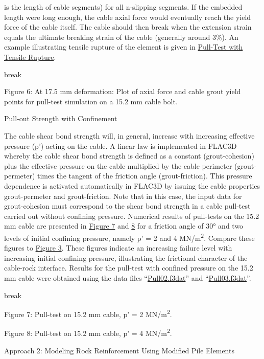 \documentclass[a4paper, nobind]{templates/ociamthesis}
\begin{document}
is the length of cable segments) for all n-slipping
segments. If the embedded length were long enough, the cable axial force
would
eventually reach the yield force of the cable itself. The cable should
then
break when the extension strain equals the ultimate breaking strain of
the cable
(generally around 3\%). An example illustrating tensile rupture of the
element is
given in \protect\hyperlink{pulltest-tensile-rupture-section}{Pull-Test with Tensile
Rupture}.

break

Figure 6: At 17.5 mm deformation: Plot of axial force and cable
grout yield points for pull-test simulation on a 15.2 mm cable bolt.

Pull-out Strength with
Confinement

The cable shear bond strength will, in general, increase with increasing
effective pressure (p') acting on the cable. A linear law
is implemented in FLAC3D whereby the cable shear
bond strength is defined as a constant (grout-cohesion) plus the
effective pressure on the cable
multiplied by the cable perimeter (grout-permeter)
times the tangent of the friction angle (grout-friction). This pressure
dependence is activated
automatically in FLAC3D by issuing the cable
properties grout-permeter and grout-friction. Note that in this case,
the input data for
grout-cohesion must correspond to the shear bond
strength in a cable pull-test carried out without confining pressure.
Numerical
results of pull-tests on the 15.2 mm cable are presented in \protect\hyperlink{pulltest-cable2}{Figure
7} and \protect\hyperlink{pulltest-cable3}{8} for a
friction angle of 30° and two levels of initial confining pressure,
namely p' = 2 and 4 MN/m\textsuperscript{2}. Compare these figures to \protect\hyperlink{pulltest-cable1}{Figure
3}. These figures indicate an increasing
failure level with increasing initial confining pressure, illustrating
the
frictional character of the cable-rock interface. Results for the
pull-test with
confined pressure on the 15.2 mm cable were obtained using the data
files ``\protect\hyperlink{pulltest02data}{Pull02.f3dat}''
and ``\protect\hyperlink{pulltest03data}{Pull03.f3dat}''.

break

Figure 7: Pull-test on 15.2 mm cable, p'
= 2 MN/m\textsuperscript{2}.

Figure 8: Pull-test on 15.2 mm cable, p'
= 4 MN/m\textsuperscript{2}.

Approach 2: Modeling Rock Reinforcement Using Modified Pile
Elements
\end{document}
